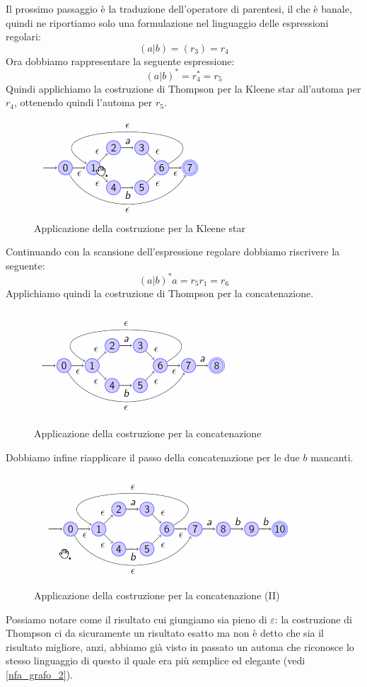 \documentclass[class=book, crop=false, oneside, 12pt]{standalone}
\begin{document}
Il prossimo passaggio è la traduzione dell'operatore di parentesi, il che è banale, quindi ne riportiamo solo una formulazione nel linguaggio delle espressioni regolari:
\begin{equation*}
    (a|b)=(r_3)=r_4
\end{equation*}
Ora dobbiamo rappresentare la seguente espressione:
\begin{equation}
    (a|b)^* = r_4^* = r_5
\end{equation}
Quindi applichiamo la costruzione di Thompson per la Kleene star all’automa per \(r_4\), ottenendo quindi l’automa per \(r_5\).
\begin{figure}
    \centering
    \includegraphics[width=.5\textwidth,keepaspectratio]{esempio_Thompson_2}
    \caption{Applicazione della costruzione per la Kleene star}
    \label{esempio_Thompson_2}
\end{figure}
Continuando con la scansione dell’espressione regolare dobbiamo riscrivere la seguente:
\begin{equation}
    (a|b)^* a = r_5 r_1 = r_6
\end{equation}
Applichiamo quindi la costruzione di Thompson per la concatenazione.
\begin{figure}
    \centering
    \includegraphics[width=.5\textwidth,keepaspectratio]{esempio_Thompson_3}
    \caption{Applicazione della costruzione per la concatenazione}
    \label{esempio_Thompson_3}
\end{figure}
Dobbiamo infine riapplicare il passo della concatenazione per le due \(b\) mancanti.
\begin{figure}
    \centering
    \includegraphics[width=.5\textwidth,keepaspectratio]{esempio_Thompson_4}
    \caption{Applicazione della costruzione per la concatenazione (II)}
    \label{esempio_Thompson_4}
\end{figure}
Possiamo notare come il risultato cui giungiamo sia pieno di \(\varepsilon\): la costruzione di Thompson ci da sicuramente un risultato esatto ma non è detto che sia il risultato migliore, anzi, abbiamo già visto in passato un automa che riconosce lo stesso linguaggio di questo il quale era più semplice ed elegante (vedi \ref{nfa_grafo_2}).
\end{document}
